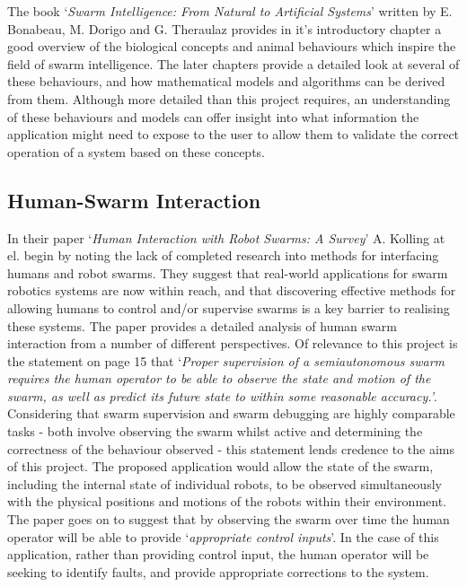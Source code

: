 \documentclass[titlepage,hidelinks,10pt]{article}
\begin{document}
\begin{multicols*}{2}
The book `\textit{Swarm Intelligence: From Natural to Artificial Systems}\cite{FromNaturaltoArtificial}' written by E. Bonabeau, M. Dorigo and G. Theraulaz provides in it's introductory chapter a good overview of the biological concepts and animal behaviours which inspire the field of swarm intelligence. The later chapters provide a detailed look at several of these behaviours, and how mathematical models and algorithms can be derived from them. Although more detailed than this project requires, an understanding of these behaviours and models can offer insight into what information the application might need to expose to the user to allow them to validate the correct operation of a system based on these concepts.

\subsection{Human-Swarm Interaction} \label{HumanSwarmInteraction}
In their paper `\textit{Human Interaction with Robot Swarms: A Survey}\cite{HumanSwarmInteractionSurvey}' A. Kolling at el. begin by noting the lack of completed research into methods for interfacing humans and robot swarms. They suggest that real-world applications for swarm robotics systems are now within reach, and that discovering effective methods for allowing humans to control and/or supervise swarms is a key barrier to realising these systems. The paper provides a detailed analysis of human swarm interaction from a number of different perspectives. Of relevance to this project is the statement on page 15 that `\textit{Proper supervision of a semiautonomous swarm requires the human operator to be able to observe the state and motion of the swarm, as well as predict its future state to within some reasonable accuracy.'}. Considering that swarm supervision and swarm debugging are highly comparable tasks - both involve observing the swarm whilst active and determining the correctness of the behaviour observed - this statement lends credence to the aims of this project. The proposed application would allow the state of the swarm, including the internal state of individual robots, to be observed simultaneously with the physical positions and motions of the robots within their environment. The paper goes on to suggest that by observing the swarm over time the human operator will be able to provide `\textit{appropriate control inputs}'. In the case of this application, rather than providing control input, the human operator will be seeking to identify faults, and provide appropriate corrections to the system.


\end{multicols*}
\end{document}
